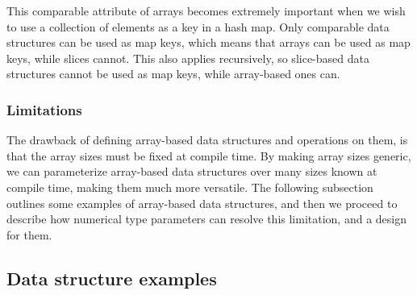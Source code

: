 This comparable attribute of arrays becomes extremely important when we wish to
use a collection of elements as a key in a hash map. Only comparable data
structures can be used as map keys, which means that arrays can be used as map
keys, while slices cannot. This also applies recursively, so slice-based data
structures cannot be used as map keys, while array-based ones can.

\subsubsection{Limitations}

The drawback of defining array-based data structures and operations on them, is
that the array sizes must be fixed at compile time. By making array sizes
generic, we can parameterize array-based data structures over many sizes known
at compile time, making them much more versatile. The following subsection
outlines some examples of array-based data structures, and then we proceed to
describe how numerical type parameters can resolve this limitation, and a design
for them.

\subsection{Data structure examples}












